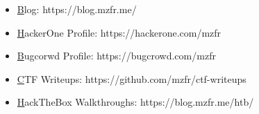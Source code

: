 \begin{itemize}
    \item {\href{https://blog.mzfr.me/}Blog: } https://blog.mzfr.me/
    
    \item {\href{https://hackerone.com/mzfr}HackerOne Profile: } https://hackerone.com/mzfr

    \item {\href{https://bugcrowd.com/mzfr}Bugcorwd Profile: } https://bugcrowd.com/mzfr
    
    \item {\href{https://github.com/mzfr/ctf-writeups}CTF Writeups: } https://github.com/mzfr/ctf-writeups

    \item {\href{https://blog.mzfr.me/htb/}HackTheBox Walkthroughs: } https://blog.mzfr.me/htb/

\end{itemize}
